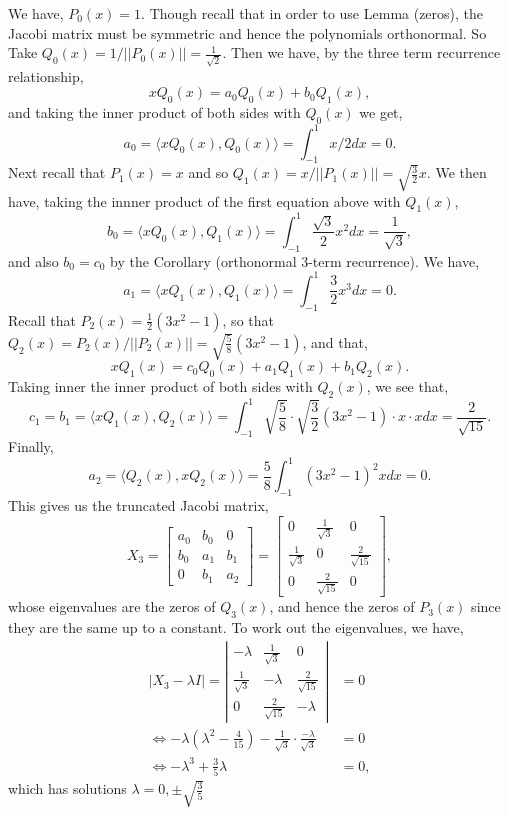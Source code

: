 \documentclass[12pt,a4paper]{article}
\begin{document}
We have, $P_0(x) = 1$. Though recall that in order to use Lemma (zeros), the Jacobi matrix must be symmetric and hence the polynomials orthonormal. So Take $Q_0(x) = 1/||P_0(x)|| = \frac{1}{\sqrt{2}}$. Then we have, by the three term recurrence relationship,
\[
xQ_0(x) = a_0Q_0(x) + b_0Q_1(x),
\]
and taking the inner product of both sides with $Q_0(x)$ we get,
\[
a_0 = \ensuremath{\langle} xQ_0(x), Q_0(x) \ensuremath{\rangle} = \int_{-1}^1 x/2 dx = 0.
\]
Next recall that $P_1(x) =  x$ and so $Q_1(x) = x/||P_1(x)||=\sqrt{\frac{3}{2}} x$. We then have, taking the innner product of the first equation above with $Q_ 1(x)$,
\[
b_0 = \ensuremath{\langle} xQ_0(x), Q_1(x)\ensuremath{\rangle} = \int_{-1}^1 \frac{\sqrt{3}}{2}x^2 dx = \frac{1}{\sqrt{3}},
\]
and also $b_0 = c_0$ by the Corollary (orthonormal 3-term recurrence). We have,
\[
a_1 = \ensuremath{\langle} xQ_1(x), Q_1(x)\ensuremath{\rangle} = \int_{-1}^1 \frac{3}{2}x^3 dx = 0.
\]
Recall that $P_2(x) = \frac{1}{2}(3x^2 - 1)$, so that $Q_2(x) = P_2(x)/||P_2(x)|| = \sqrt{\frac{5}{8}}(3x^2 - 1)$, and that,
\[
xQ_1(x) = c_0Q_0(x) + a_1Q_1(x) + b_1Q_2(x).
\]
Taking inner the inner product of both sides with $Q_2(x)$, we see that,
\[
c_1 = b_1 = \ensuremath{\langle} xQ_1(x), Q_2(x)\ensuremath{\rangle} = \int_{-1}^1 \sqrt{\frac{5}{8}} \cdot \sqrt{\frac{3}{2}}(3x^2 - 1)\cdot x \cdot xdx =\frac{2}{\sqrt{15}}.
\]
Finally,
\[
a_2 = \ensuremath{\langle} Q_2(x), xQ_2(x) \ensuremath{\rangle} = \frac{5}{8}\int_{-1}^1 (3x^2 - 1)^2 x dx = 0.
\]
This gives us the truncated Jacobi matrix,
\[
X_3 = \left[\begin{matrix}
a_0 & b_0	& 0 \\
b_0 & a_1 & b_1 \\
0&b_1 & a_2
\end{matrix}
 \right] = \left[\begin{matrix}
0 & \frac{1}{\sqrt{3}}	& 0 \\
\frac{1}{\sqrt{3}} & 0 & \frac{2}{\sqrt{15}} \\
0& \frac{2}{\sqrt{15}} & 0
\end{matrix}
 \right],
\]
whose eigenvalues are the zeros of $Q_3(x)$, and hence the zeros of $P_3(x)$ since they are the same up to a constant. To work out the eigenvalues, we have,
\begin{align*}
	|X_3 - \lambda I| = \left| \begin{matrix}
		-\lambda & \frac{1}{\sqrt{3}} & 0\\
		\frac{1}{\sqrt{3}} & -\lambda & \frac{2}{\sqrt{15}}\\
		0 & \frac{2}{\sqrt{15}} & -\lambda
	\end{matrix}\right| &= 0 \\
	\Leftrightarrow -\lambda(\lambda^2 - \frac{4}{15}) - \frac{1}{\sqrt{3}}\cdot \frac{-\lambda}{\sqrt{3}} &=0 \\
	\Leftrightarrow -\lambda^3 + \frac{3}{5}\lambda &= 0,
\end{align*}
which has solutions $\lambda = 0, \ensuremath{\pm} \sqrt{\frac{3}{5}}$
\end{document}
